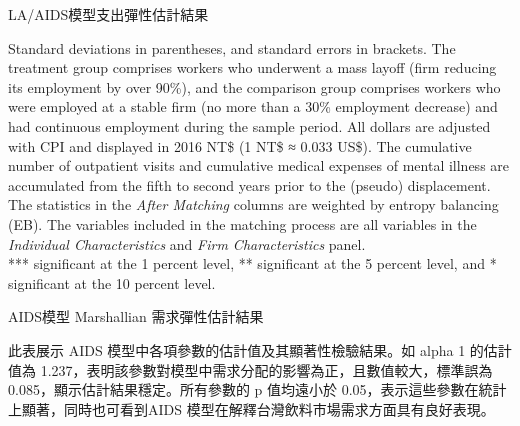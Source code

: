 \begin{table}[H]
    \caption{LA/AIDS模型支出彈性估計結果} \label{laaids_exp}
    \center
    
\end{table}
\vspace{-2em}
\begin{singlespace}
    \begin{footnotesize}
     Standard deviations in parentheses, and standard errors in brackets. The treatment group comprises workers who underwent a mass layoff (firm reducing its employment by over 90\%), and the comparison group comprises workers who were employed at a stable firm (no more than a 30\% employment decrease) and had continuous employment during the sample period. All dollars are adjusted with CPI and displayed in 2016 NT\$ (1 NT\$ ≈ 0.033 US\$). The cumulative number of outpatient visits and cumulative medical expenses of mental illness are accumulated from the fifth to second years prior to the (pseudo) displacement. The statistics in the {\it After Matching} columns are weighted by entropy balancing (EB). The variables included in the matching process are all variables in the {\it Individual Characteristics} and {\it Firm Characteristics} panel. \\
    *** significant at the 1 percent level, ** significant at the 5 percent level, and * significant at the 10 percent level.
    \end{footnotesize}
\end{singlespace}

\begin{table}[H]
    \caption{AIDS模型 Marshallian 需求彈性估計結果}
    \center
      \label{aids_marshall}
\end{table}
\vspace{-2em}
\begin{singlespace}
    \begin{footnotesize}
        \raggedright
         此表展示 AIDS 模型中各項參數的估計值及其顯著性檢驗結果。如 alpha 1 的估計值為 1.237，表明該參數對模型中需求分配的影響為正，且數值較大，標準誤為 0.085，顯示估計結果穩定。所有參數的 p 值均遠小於 0.05，表示這些參數在統計上顯著，同時也可看到AIDS 模型在解釋台灣飲料市場需求方面具有良好表現。 
    \end{footnotesize}
\end{singlespace}

